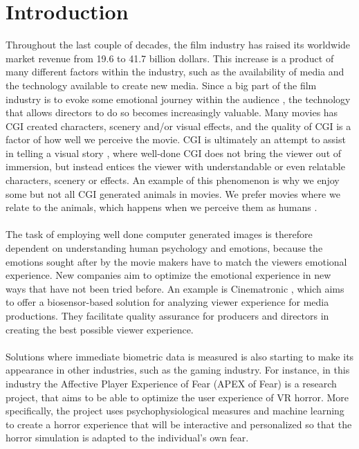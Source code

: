 \chapter{Introduction}
Throughout the last couple of decades, the film industry has raised its worldwide market revenue from 19.6 to 41.7 billion dollars. 
This increase is a product of many different factors within the industry, such as the availability of media and the technology available to create new media. Since a big part of the film industry is to evoke some emotional journey within the audience \cite{EmotionsWatchingMovies}, the technology that allows directors to do so becomes increasingly valuable. Many movies has CGI created characters, scenery and/or visual effects, and the quality of CGI is a factor of how well we perceive the movie. CGI is ultimately an attempt to assist in telling a visual story \cite{}, where well-done CGI does not bring the viewer out of immersion, but instead entices the viewer with understandable or even relatable characters, scenery or effects. An example of this phenomenon is why we enjoy some but not all CGI generated animals in movies. We prefer movies where we relate to the animals, which happens when we perceive them as humans \cite{}. 
\\ \\
The task of employing well done computer generated images is therefore dependent on understanding human psychology and emotions, because the emotions sought after by the movie makers have to match the viewers emotional experience.
New companies aim to optimize the emotional experience in new ways that have not been tried before. An example is Cinematronic \cite{}, which aims to offer a biosensor-based solution for analyzing viewer experience for media productions. They facilitate quality assurance for producers and directors in creating the best possible viewer experience.
\\ \\
Solutions where immediate biometric data is measured is also starting to make its appearance in other industries, such as the gaming industry. For instance, in this industry the Affective Player Experience of Fear (APEX of Fear) is a research project, that aims to be able to optimize the user experience of VR horror. More specifically, the project uses psychophysiological measures and machine learning to create a horror experience that will be interactive and personalized so that the horror simulation is adapted to the individual's own fear. 
